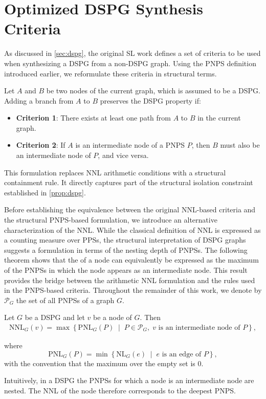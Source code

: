 \section{Optimized \acs{DSPG} Synthesis Criteria}
\label{sec:optimized_criteria}
As discussed in \cref{sec:dspg}, the original \ac{SL} work defines a set of criteria to be used when synthesizing a \ac{DSPG} from a non-\ac{DSPG} graph. Using the \ac{PNPS} definition introduced earlier, we reformulate these criteria in structural terms.

\begin{corollary}
\label{cor:pnps-criteria}
Let $A$ and $B$ be two nodes of the current graph, which is assumed to be a \ac{DSPG}. Adding a branch from $A$ to $B$ preserves the \ac{DSPG} property if:
\begin{itemize}
    \item \textbf{Criterion 1}: There exists at least one path from $A$ to $B$ in the current graph.
    \item \textbf{Criterion 2}: If $A$ is an intermediate node of a \ac{PNPS} $P$, then $B$ must also be an intermediate node of $P$, and vice versa.
\end{itemize}
\end{corollary}

This formulation replaces \ac{NNL} arithmetic conditions with a structural containment rule. It directly captures part of the structural isolation constraint established in \cref{prop:dspg}.

Before establishing the equivalence between the original \ac{NNL}-based criteria and the structural \ac{PNPS}-based formulation, we introduce an alternative characterization of the \ac{NNL}. While the classical definition of \ac{NNL} is expressed as a counting measure over \acp{PPS}, the structural interpretation of \ac{DSPG} graphs suggests a formulation in terms of the nesting depth of \acp{PNPS}. The following theorem shows that the  of a node can equivalently be expressed as the maximum  of the \acp{PNPS} in which the node appears as an intermediate node. This result provides the bridge between the arithmetic \ac{NNL} formulation and the rules used in the \ac{PNPS}-based criteria. Throughout the remainder of this work, we denote by $\mathcal{P}_G$ the set of all \acp{PNPS} of a graph $G$.

\begin{theorem}
\label{thm:pnps-nnl}
Let $G$ be a \ac{DSPG} and let $v$ be a node of $G$. Then
\begin{align}
\label{eq:pnps-nnl}
\mathrm{NNL}_G(v) = 
\max\left\{
\mathrm{PNL}_G(P)
\;\middle|\;
P\in\mathcal{P}_G,\;
v \text{ is an intermediate node of } P
\right\}, 
\end{align}

where
\[
\mathrm{PNL}_G(P)
=
\min\left\{
\mathrm{NL}_G(e)
\;\middle|\;
e \text{ is an edge of } P
\right\},
\]
with the convention that the maximum over the empty set is $0$.
\end{theorem}
Intuitively, in a \ac{DSPG} the \acp{PNPS} for which a node is an intermediate node are nested. The \ac{NNL} of the node therefore corresponds to the deepest \ac{PNPS}.

